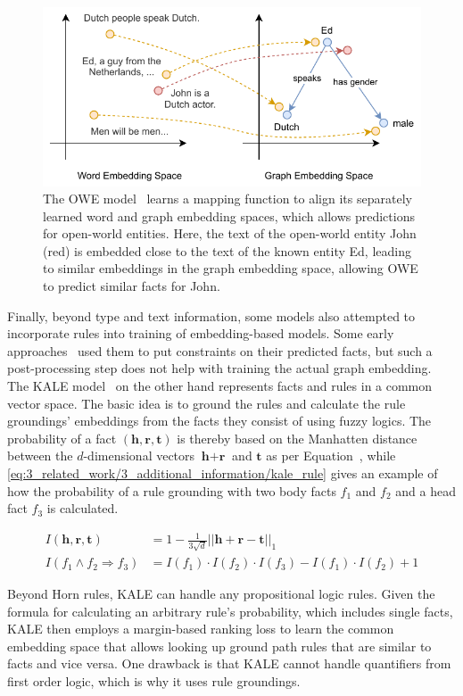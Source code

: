 \begin{figure}[t]
    \centering
    \includegraphics{3_related_work/3_additional_information/owe}
    \caption{The OWE model~\cite{Shah2019AnOE} learns a mapping function to align its separately learned word and graph embedding spaces, which allows predictions for open-world entities. Here, the text of the open-world entity John (red) is embedded close to the text of the known entity Ed, leading to similar embeddings in the graph embedding space, allowing OWE to predict similar facts for John.}
    \label{fig:3_related_work/3_additional_information/owe}
\end{figure}

Finally, beyond type and text information, some models also attempted to incorporate rules into training of embedding-based models. Some early approaches~\cite{Wang2015KnowledgeBC, Wei2015LargescaleKB} used them to put constraints on their predicted facts, but such a post-processing step does not help with training the actual graph embedding. The KALE model~\cite{Guo2016JointlyEK} on the other hand represents facts and rules in a common vector space. The basic idea is to ground the rules and calculate the rule groundings' embeddings from the facts they consist of using fuzzy logics. The probability of a fact $(\textbf{h}, \textbf{r}, \textbf{t})$ is thereby based on the Manhatten distance between the $d$-dimensional vectors $\textbf{h} + \textbf{r}$ and $\textbf{t}$ as per Equation~\cite{eq:3_related_work/3_additional_information/kale_fact}, while \autoref{eq:3_related_work/3_additional_information/kale_rule} gives an example of how the probability of a rule grounding with two body facts $f_1$ and $f_2$ and a head fact $f_3$ is calculated.

\begin{align}
    I(\textbf{h}, \textbf{r}, \textbf{t}) &= 1 - \frac{1}{3 \sqrt {d}} {|| \textbf{h} + \textbf{r} - \textbf{t} ||}_1
    \label{eq:3_related_work/3_additional_information/kale_fact} \\
    I(f_1 \land f_2 \Rightarrow f_3) &= I(f_1) \cdot I(f_2) \cdot I(f_3) - I(f_1) \cdot I(f_2) + 1
    \label{eq:3_related_work/3_additional_information/kale_rule}
\end{align}

Beyond Horn rules, KALE can handle any propositional logic rules. Given the formula for calculating an arbitrary rule's probability, which includes single facts, KALE then employs a margin-based ranking loss to learn the common embedding space that allows looking up ground path rules that are similar to facts and vice versa. One drawback is that KALE cannot handle quantifiers from first order logic, which is why it uses rule groundings.
